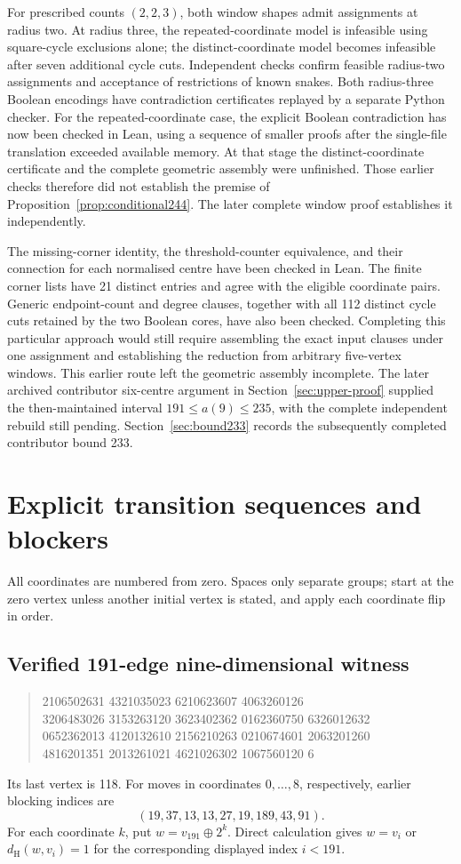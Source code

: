 \documentclass[11pt,a4paper]{article}
\theoremstyle{definition}
\theoremstyle{remark}
\newcommand{\Ham}{d_{\mathrm H}}
\begin{document}
For prescribed counts $(2,2,3)$, both window shapes admit assignments at radius two. At radius three, the repeated-coordinate model is infeasible using square-cycle exclusions alone; the distinct-coordinate model becomes infeasible after seven additional cycle cuts. Independent checks confirm feasible radius-two assignments and acceptance of restrictions of known snakes. Both radius-three Boolean encodings have contradiction certificates replayed by a separate Python checker. For the repeated-coordinate case, the explicit Boolean contradiction has now been checked in Lean, using a sequence of smaller proofs after the single-file translation exceeded available memory. At that stage the distinct-coordinate certificate and the complete geometric assembly were unfinished. Those earlier checks therefore did not establish the premise of Proposition~\ref{prop:conditional244}. The later complete window proof establishes it independently.

The missing-corner identity, the threshold-counter equivalence, and their connection for each normalised centre have been checked in Lean. The finite corner lists have 21 distinct entries and agree with the eligible coordinate pairs. Generic endpoint-count and degree clauses, together with all 112 distinct cycle cuts retained by the two Boolean cores, have also been checked. Completing this particular approach would still require assembling the exact input clauses under one assignment and establishing the reduction from arbitrary five-vertex windows. This earlier route left the geometric assembly incomplete. The later archived contributor six-centre argument in Section~\ref{sec:upper-proof} supplied the then-maintained interval $191\le a(9)\le235$, with the complete independent rebuild still pending. Section~\ref{sec:bound233} records the subsequently completed contributor bound 233.

\section{Explicit transition sequences and blockers}\label{app:witness}
All coordinates are numbered from zero. Spaces only separate groups; start at the zero vertex unless another initial vertex is stated, and apply each coordinate flip in order.
\subsection{Verified 191-edge nine-dimensional witness}
\begin{quote}\small{} 2106502631 4321035023 6210623607 4063260126\\
3206483026 3153263120 3623402362 0162360750 6326012632\\
0652362013 4120132610 2156210263 0210674601 2063201260\\
4816201351 2013261021 4621026302 1067560120 6
\end{quote}
Its last vertex is 118. For moves in coordinates $0,\ldots,8$, respectively, earlier blocking indices are
\[
(19,37,13,13,27,19,189,43,91).
\]
For each coordinate $k$, put $w=v_{191}\mathbin{\oplus}2^k$. Direct calculation gives $w=v_i$ or $\Ham(w,v_i)=1$ for the corresponding displayed index $i<191$.
\end{document}
